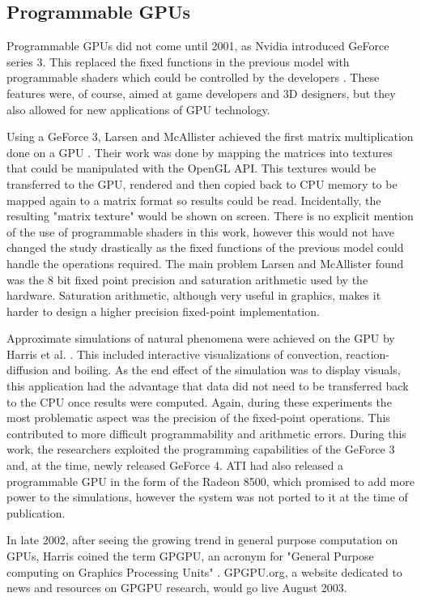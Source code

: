 \subsection{Programmable GPUs}
Programmable GPUs did not come until 2001, as Nvidia introduced GeForce series 3. This replaced the fixed functions in the previous model with programmable shaders which could be controlled by the developers \cite{nvidia_nfinitefx_pixel, nvidia_nfinitefx_vertex}. These features were, of course, aimed at game developers and 3D designers, but they also allowed for new applications of GPU technology.

Using a GeForce 3, Larsen and McAllister achieved the first matrix multiplication done on a GPU \cite{early_matrix_multiplication_gpgpu}. Their work was done by mapping the matrices into textures that could be manipulated with the OpenGL API. This textures would be transferred to the GPU, rendered and then copied back to CPU memory to be mapped again to a matrix format so results could be read. Incidentally, the resulting "matrix texture" would be shown on screen. There is no explicit mention of the use of programmable shaders in this work, however this would not have changed the study drastically as the fixed functions of the previous model could handle the operations required. The main problem Larsen and McAllister found was the 8 bit fixed point precision and saturation arithmetic used by the hardware. Saturation arithmetic, although very useful in graphics, makes it harder to design a higher precision fixed-point implementation.

Approximate simulations of natural phenomena were achieved on the GPU by Harris et al. \cite {physics_simulations_gpgpu}. This included interactive visualizations of convection, reaction-diffusion and boiling. As the end effect of the simulation was to display visuals, this application had the advantage that data did not need to be transferred back to the CPU once results were computed. Again, during these experiments the most problematic aspect was the precision of the fixed-point operations. This contributed to more difficult programmability and arithmetic errors. During this work, the researchers exploited the programming capabilities of the GeForce 3 and, at the time, newly released GeForce 4. ATI had also released a programmable GPU in the form of the Radeon 8500, which promised to add more power to the simulations, however the system was not ported to it at the time of publication.

In late 2002, after seeing the growing trend in general purpose computation on GPUs, Harris coined the term GPGPU, an acronym for "General Purpose computing on Graphics Processing Units" \cite{brief_history_gpgpu}. GPGPU.org, a website dedicated to news and resources on GPGPU research, would go live August 2003.

